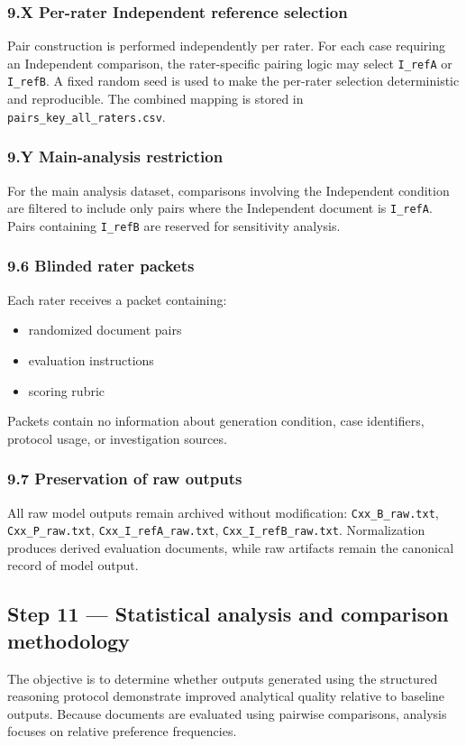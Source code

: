 {\subsubsection*{9.X Per-rater Independent reference selection}
Pair construction is performed independently per rater. For each case requiring an Independent comparison,
the rater-specific pairing logic may select \texttt{I\_refA} or \texttt{I\_refB}. A fixed random seed is used to make the
per-rater selection deterministic and reproducible. The combined mapping is stored in \texttt{pairs\_key\_all\_raters.csv}.

\subsubsection*{9.Y Main-analysis restriction }
For the main analysis dataset, comparisons involving the Independent condition are filtered to include only
pairs where the Independent document is \texttt{I\_refA}. Pairs containing \texttt{I\_refB} are reserved for sensitivity analysis.
\subsubsection*{9.6 Blinded rater packets}
Each rater receives a packet containing:
\begin{itemize}
  \item randomized document pairs
  \item evaluation instructions
  \item scoring rubric
\end{itemize}
Packets contain no information about generation condition, case identifiers, protocol usage, or investigation sources.

\subsubsection*{9.7 Preservation of raw outputs}
All raw model outputs remain archived without modification:
\texttt{Cxx\_B\_raw.txt}, \texttt{Cxx\_P\_raw.txt}, \texttt{Cxx\_I\_refA\_raw.txt}, \texttt{Cxx\_I\_refB\_raw.txt}.
Normalization produces derived evaluation documents, while raw artifacts remain the canonical record of model output.

\subsection*{Step 11 --- Statistical analysis and comparison methodology}
The objective is to determine whether outputs generated using the structured reasoning protocol demonstrate improved analytical quality
relative to baseline outputs. Because documents are evaluated using pairwise comparisons, analysis focuses on relative preference frequencies.

}
